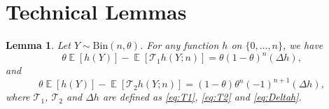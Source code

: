 \documentclass[12pt,letterpaper]{article}
\newcommand{\E}{\operatorname{\mathbb{E}}}
\newcommand{\T}{\mathcal{T}}
\newtheorem{lemma}{Lemma}[section]
\begin{document}
\section{Technical Lemmas}
\begin{lemma}\label{lemma:main}
  Let $Y\sim \mathrm{Bin}(n, \theta)$. For any function $h$ on $\{0, \ldots, n\}$, we have 
    \begin{equation}
      \label{eq:T1_bias}
      \theta \E[h(Y)] - \E[\T_1 h(Y; n)] = \theta (1 - \theta)^n (\Delta h),
    \end{equation}
    and
    \begin{equation}
      \label{eq:T2_bias}
      \theta \E[h(Y)] - \E[\T_2 h(Y; n)] = (1 - \theta) \theta^n (-1)^{n+1}(\Delta h),
    \end{equation} 
    where $\mathcal{T}_1$, $\mathcal{T}_2$ and $\Delta h$ are defined as \eqref{eq:T1}, \eqref{eq:T2} and \eqref{eq:Deltah}. 
\end{lemma}
\end{document}
